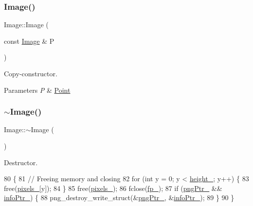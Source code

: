 \subsubsection{\texorpdfstring{Image()}{Image()}\hspace{0.1cm}{\footnotesize\ttfamily [2/2]}}
{\footnotesize\ttfamily Image\+::\+Image (\begin{DoxyParamCaption}\item[{const \mbox{\hyperlink{class_image}{Image}} \&}]{P }\end{DoxyParamCaption})}



Copy-\/constructor. 


\begin{DoxyParams}{Parameters}
{\em P} & \mbox{\hyperlink{class_point}{Point}} \\
\hline
\end{DoxyParams}
\mbox{\label{class_image_a0294f63700543e11c0f0da85601c7ae5}} 
\subsubsection{\texorpdfstring{$\sim$\+Image()}{~Image()}}
{\footnotesize\ttfamily Image\+::$\sim$\+Image (\begin{DoxyParamCaption}{ }\end{DoxyParamCaption})}



Destructor. 


\begin{DoxyCode}
80               \{
81     \textcolor{comment}{// Freeing memory and closing}
82     \textcolor{keywordflow}{for} (\textcolor{keywordtype}{int} y = 0; y < \mbox{\hyperlink{class_image_a64a699c5bb8e8a18c6971a8032806dba}{height\_}}; y++) \{
83         free(\mbox{\hyperlink{class_image_a51351c8507499d09cb9667c20ef01faf}{pixels\_}}[y]);
84       \}
85     free(\mbox{\hyperlink{class_image_a51351c8507499d09cb9667c20ef01faf}{pixels\_}});
86     fclose(\mbox{\hyperlink{class_image_a4d43b19efb469f7c9fb65e7202d7ba7f}{fp\_}});
87     \textcolor{keywordflow}{if} (\mbox{\hyperlink{class_image_aaf607d2596bac09b13370599d9ba6d8c}{pngPtr\_}} \&\& \mbox{\hyperlink{class_image_a505878e5e19500e3cc1b940067faa584}{infoPtr\_}}) \{
88         png\_destroy\_write\_struct(\&\mbox{\hyperlink{class_image_aaf607d2596bac09b13370599d9ba6d8c}{pngPtr\_}}, \&\mbox{\hyperlink{class_image_a505878e5e19500e3cc1b940067faa584}{infoPtr\_}});
89     \}
90 \}
\end{DoxyCode}


